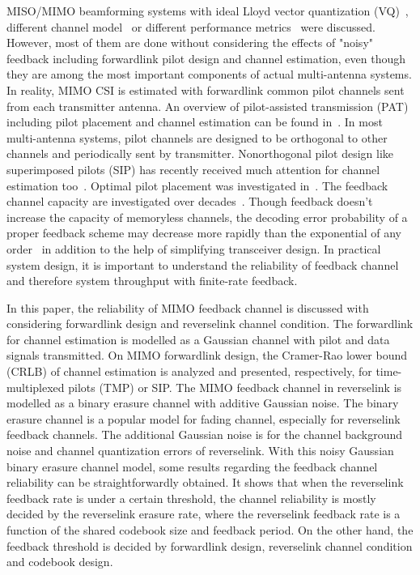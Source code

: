 \documentclass[10pt,fleqn, twocolumn]{IEEEtran}
\begin{document}
MISO/MIMO beamforming systems with ideal Lloyd vector quantization
(VQ)~\cite{Narula98}, different channel model~\cite{Mukka03} or
different performance metrics~\cite{PXia04,Roh04} were discussed.
However, most of them are done without considering the effects of
"noisy" feedback including forwardlink pilot design and channel
estimation, even though they are among the most important
components of actual multi-antenna systems. In reality, MIMO CSI
is estimated with forwardlink common pilot channels sent from each
transmitter antenna. An overview of pilot-assisted transmission
(PAT) including pilot placement and channel estimation can be
found in~\cite{Tong04}. In most multi-antenna systems, pilot
channels are designed to be orthogonal to other channels and
periodically sent by transmitter. Nonorthogonal pilot design like
superimposed pilots (SIP) has recently received much attention for
channel estimation too~\cite{Coldrey06}. Optimal pilot placement
was investigated in~\cite{Dong02}. The feedback channel capacity
are investigated over decades~\cite{Shannon56,Kim06}. Though
feedback doesn't increase the capacity of memoryless channels, the
decoding error probability of a proper feedback scheme may
decrease more rapidly than the exponential of any
order~\cite{Kramer69} in addition to the help of simplifying
transceiver design. In practical system design, it is important to
understand the reliability of feedback channel and therefore
system throughput with finite-rate feedback.

In this paper, the reliability of MIMO feedback channel is
discussed with considering forwardlink design and reverselink
channel condition. The forwardlink for channel estimation is
modelled as a Gaussian channel with pilot and data signals
transmitted. On MIMO forwardlink design, the Cramer-Rao lower
bound (CRLB) of channel estimation is analyzed and presented,
respectively, for time-multiplexed pilots (TMP) or SIP. The MIMO
feedback channel in reverselink is modelled as a binary erasure
channel with additive Gaussian noise. The binary erasure channel
is a popular model for fading channel, especially for reverselink
feedback channels. The additional Gaussian noise is for the
channel background noise and channel quantization errors of
reverselink. With this noisy Gaussian binary erasure channel
model, some results regarding the feedback channel reliability can
be straightforwardly obtained. It shows that when the reverselink
feedback rate is under a certain threshold, the channel
reliability is mostly decided by the reverselink erasure rate,
where the reverselink feedback rate is a function of the shared
codebook size and feedback period. On the other hand, the feedback
threshold is decided by forwardlink design, reverselink channel
condition and codebook design.
\end{document}
